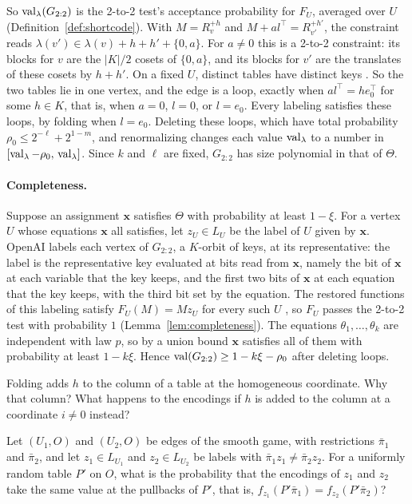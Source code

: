 So $\operatorname{val}_\lambda(G_{2:2})$ is the 2-to-2 test's acceptance probability for $F_U$, averaged over $U$ (Definition~\ref{def:shortcode}). With $M=R_v^{+h}$ and $M+al^\top=R_{v'}^{+h'}$, the constraint reads $\lambda(v')\in\lambda(v)+h+h'+\{0,a\}$. For $a\ne0$ this is a 2-to-2 constraint: its blocks for $v$ are the $|K|/2$ cosets of $\{0,a\}$, and its blocks for $v'$ are the translates of these cosets by $h+h'$. On a fixed $U$, distinct tables have distinct keys \cite[Section~4.3]{OAI}. So the two tables lie in one vertex, and the edge is a loop, exactly when $al^\top=he_0^\top$ for some $h\in K$, that is, when $a=0$, $l=0$, or $l=e_0$. Every labeling satisfies these loops, by folding when $l=e_0$. Deleting these loops, which have total probability $\rho_0\le2^{-\ell}+2^{1-m}$, and renormalizing changes each value $\operatorname{val}_\lambda$ to a number in $[\operatorname{val}_\lambda-\rho_0,\,\operatorname{val}_\lambda]$. Since $k$ and $\ell$ are fixed, $G_{2:2}$ has size polynomial in that of $\Theta$.

\paragraph{Completeness.} Suppose an assignment $\mathbf x$ satisfies $\Theta$ with probability at least $1-\xi$. For a vertex $U$ whose equations $\mathbf x$ all satisfies, let $z_U\in L_U$ be the label of $U$ given by $\mathbf x$. OpenAI labels each vertex of $G_{2:2}$, a $K$-orbit of keys, at its representative: the label is the representative key evaluated at bits read from $\mathbf x$, namely the bit of $\mathbf x$ at each variable that the key keeps, and the first two bits of $\mathbf x$ at each equation that the key keeps, with the third bit set by the equation. The restored functions of this labeling satisfy $F_U(M)=Mz_U$ for every such $U$ \cite[Section~4.3 and proof of Lemma~4.3]{OAI}, so $F_U$ passes the 2-to-2 test with probability $1$ (Lemma~\ref{lem:completeness}). The equations $\theta_1,\dots,\theta_k$ are independent with law $p$, so by a union bound $\mathbf x$ satisfies all of them with probability at least $1-k\xi$. Hence $\operatorname{val}(G_{2:2})\ge1-k\xi-\rho_0$ after deleting loops.

\chapterquestions
\begin{question}\label{q:homog}
Folding adds $h$ to the column of a table at the homogeneous coordinate. Why that column? What happens to the encodings if $h$ is added to the column at a coordinate $i\ne0$ instead?
\end{question}

\begin{question}\label{q:disagree}
Let $(U_1,O)$ and $(U_2,O)$ be edges of the smooth game, with restrictions $\bar\pi_1$ and $\bar\pi_2$, and let $z_1\in L_{U_1}$ and $z_2\in L_{U_2}$ be labels with $\bar\pi_1z_1\ne\bar\pi_2z_2$. For a uniformly random table $P'$ on $O$, what is the probability that the encodings of $z_1$ and $z_2$ take the same value at the pullbacks of $P'$, that is, $f_{z_1}(P'\bar\pi_1)=f_{z_2}(P'\bar\pi_2)$?
\end{question}
